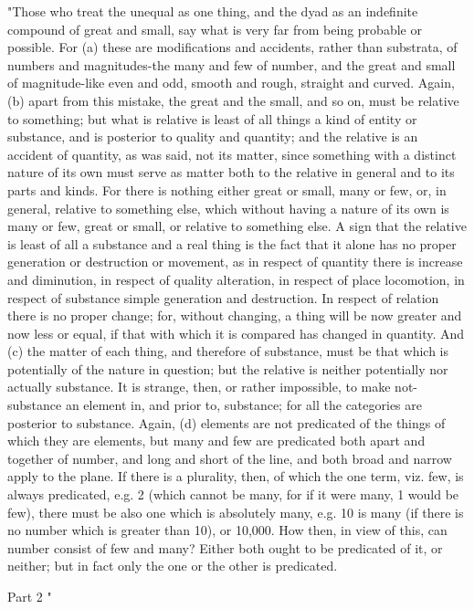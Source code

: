 "Those who treat the unequal as one thing, and the dyad as an indefinite
compound of great and small, say what is very far from being probable
or possible. For (a) these are modifications and accidents, rather
than substrata, of numbers and magnitudes-the many and few of number,
and the great and small of magnitude-like even and odd, smooth and
rough, straight and curved. Again, (b) apart from this mistake, the
great and the small, and so on, must be relative to something; but
what is relative is least of all things a kind of entity or substance,
and is posterior to quality and quantity; and the relative is an accident
of quantity, as was said, not its matter, since something with a distinct
nature of its own must serve as matter both to the relative in general
and to its parts and kinds. For there is nothing either great or small,
many or few, or, in general, relative to something else, which without
having a nature of its own is many or few, great or small, or relative
to something else. A sign that the relative is least of all a substance
and a real thing is the fact that it alone has no proper generation
or destruction or movement, as in respect of quantity there is increase
and diminution, in respect of quality alteration, in respect of place
locomotion, in respect of substance simple generation and destruction.
In respect of relation there is no proper change; for, without changing,
a thing will be now greater and now less or equal, if that with which
it is compared has changed in quantity. And (c) the matter of each
thing, and therefore of substance, must be that which is potentially
of the nature in question; but the relative is neither potentially
nor actually substance. It is strange, then, or rather impossible,
to make not-substance an element in, and prior to, substance; for
all the categories are posterior to substance. Again, (d) elements
are not predicated of the things of which they are elements, but many
and few are predicated both apart and together of number, and long
and short of the line, and both broad and narrow apply to the plane.
If there is a plurality, then, of which the one term, viz. few, is
always predicated, e.g. 2 (which cannot be many, for if it were many,
1 would be few), there must be also one which is absolutely many,
e.g. 10 is many (if there is no number which is greater than 10),
or 10,000. How then, in view of this, can number consist of few and
many? Either both ought to be predicated of it, or neither; but in
fact only the one or the other is predicated. 

Part 2 "

